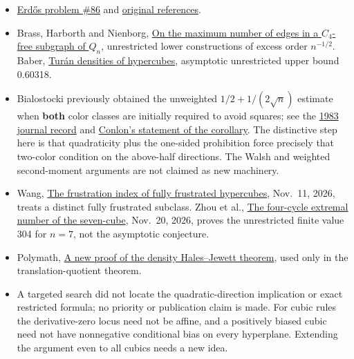 \documentclass[
  10pt,
]{article}
\providecommand{\tightlist}{%
  \setlength{\itemsep}{0pt}\setlength{\parskip}{0pt}}
\begin{document}
\begin{itemize}
\tightlist
\item
  \href{https://www.erdosproblems.com/86}{Erdős problem \#86} and
  \href{https://www.erdosproblems.com/latex/86}{original references}.
\item
  Brass, Harborth and Nienborg,
  \href{https://doi.org/10.1002/jgt.3190190104}{On the maximum number of
  edges in a \(C_4\)-free subgraph of \(Q_n\)}, unrestricted lower
  constructions of excess order \(n^{-1/2}\). Baber,
  \href{https://arxiv.org/abs/1201.3587}{Turán densities of hypercubes},
  asymptotic unrestricted upper bound 0.60318.
\item
  Bialostocki previously obtained the unweighted \(1/2+1/(2\sqrt n)\)
  estimate when \textbf{both} color classes are initially required to
  avoid squares; see the
  \href{https://combinatorialpress.com/ars/vol16a/}{1983 journal record}
  and
  \href{https://www.its.caltech.edu/~dconlon/HypercubeCycle.pdf}{Conlon's
  statement of the corollary}. The distinctive step here is that
  quadraticity plus the one-sided prohibition force precisely that
  two-color condition on the above-half directions. The Walsh and
  weighted second-moment arguments are not claimed as new machinery.
\item
  Wang, \href{https://arxiv.org/abs/2611.14906}{The frustration index of
  fully frustrated hypercubes}, Nov.~11, 2026, treats a distinct fully
  frustrated subclass. Zhou et al.,
  \href{https://arxiv.org/abs/2611.27284}{The four-cycle extremal number
  of the seven-cube}, Nov.~20, 2026, proves the unrestricted finite
  value 304 for \(n=7\), not the asymptotic conjecture.
\item
  Polymath, \href{https://arxiv.org/abs/0910.3926}{A new proof of the
  density Hales--Jewett theorem}, used only in the translation-quotient
  theorem.
\item
  A targeted search did not locate the quadratic-direction implication
  or exact restricted formula; no priority or publication claim is made.
  For cubic rules the derivative-zero locus need not be affine, and a
  positively biased cubic need not have nonnegative conditional bias on
  every hyperplane. Extending the argument even to all cubics needs a
  new idea.
\end{itemize}
\end{document}
